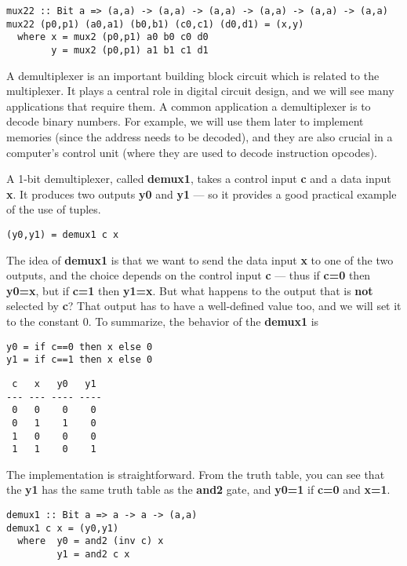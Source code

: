 \documentclass[11pt]{article}
\begin{document}
\begin{verbatim}
mux22 :: Bit a => (a,a) -> (a,a) -> (a,a) -> (a,a) -> (a,a) -> (a,a)
mux22 (p0,p1) (a0,a1) (b0,b1) (c0,c1) (d0,d1) = (x,y)
  where x = mux2 (p0,p1) a0 b0 c0 d0
        y = mux2 (p0,p1) a1 b1 c1 d1
\end{verbatim}


A demultiplexer is an important building block circuit which is
related to the multiplexer.  It plays a central role in digital
circuit design, and we will see many applications that require them.
A common application a demultiplexer is to decode binary numbers.  For
example, we will use them later to implement memories (since the
address needs to be decoded), and they are also crucial in a
computer's control unit (where they are used to decode instruction
opcodes).

A 1-bit demultiplexer, called \textbf{demux1}, takes a control input \textbf{c} and
a data input \textbf{x}.  It produces two outputs \textbf{y0} and \textbf{y1} --- so it
provides a good practical example of the use of tuples.


\begin{verbatim}
(y0,y1) = demux1 c x
\end{verbatim}


The idea of \textbf{demux1} is that we want to send the data input \textbf{x} to one
of the two outputs, and the choice depends on the control input \textbf{c}
--- thus if \textbf{c=0} then \textbf{y0=x}, but if \textbf{c=1} then \textbf{y1=x}.
But what happens to the output that is \textbf{not} selected by \textbf{c}?
That output has to have a well-defined value too, and we will set it
to the constant 0.  To summarize, the behavior of the \textbf{demux1} is


\begin{verbatim}
y0 = if c==0 then x else 0
y1 = if c==1 then x else 0
\end{verbatim}


\begin{verbatim}
 c   x   y0   y1
--- --- ---- ----
 0   0    0    0
 0   1    1    0
 1   0    0    0
 1   1    0    1
\end{verbatim}

The implementation is straightforward.  From the truth table, you can
see that the \textbf{y1} has the same truth table as the \textbf{and2} gate, and
\textbf{y0=1} if \textbf{c=0} and \textbf{x=1}.


\begin{verbatim}
demux1 :: Bit a => a -> a -> (a,a)
demux1 c x = (y0,y1)
  where  y0 = and2 (inv c) x
         y1 = and2 c x
\end{verbatim}
\end{document}
